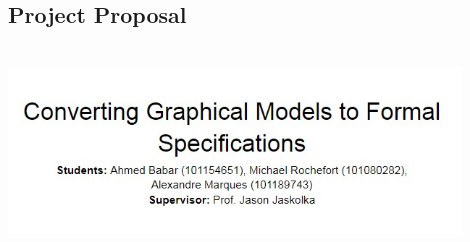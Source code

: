 \begin{appendices}
\section{Project Proposal}\label{ch:project-proposal}\\
\vfill
\includegraphics[width=0.9\textwidth]{appendices/ProposalTitle}
\vfill
\newpage

\end{appendices}

